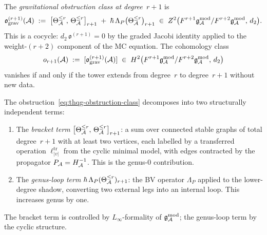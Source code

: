 \begin{definition}
\label{def:thqg-gravitational-obstruction}
The \emph{gravitational obstruction class at degree~$r{+}1$} is
\begin{equation}\label{eq:thqg-obstruction-class}
\mathfrak{o}^{(r+1)}_{\mathrm{grav}}(\mathcal{A})
\;:=\;
\bigl[\Theta_{\mathcal{A}}^{\leq r},\, \Theta_{\mathcal{A}}^{\leq r}\bigr]_{r+1}
\;+\;
\hbar\,\Lambda_P\bigl(\Theta_{\mathcal{A}}^{\leq r}\bigr)_{r+1}
\;\in\;
Z^2\bigl(F^{r+1}\mathfrak{g}_{\mathcal{A}}^{\mathrm{mod}} / F^{r+2}\mathfrak{g}_{\mathcal{A}}^{\mathrm{mod}},\, d_2\bigr).
\end{equation}
This is a cocycle: $d_2\,\mathfrak{o}^{(r+1)} = 0$ by the graded
Jacobi identity applied to the weight-$(r{+}2)$ component of the
MC equation. The cohomology class
\begin{equation}\label{eq:thqg-obstruction-cohomology}
o_{r+1}(\mathcal{A})
\;:=\;
[\mathfrak{o}^{(r+1)}_{\mathrm{grav}}(\mathcal{A})]
\;\in\;
H^2\bigl(F^{r+1}\mathfrak{g}_{\mathcal{A}}^{\mathrm{mod}} / F^{r+2}\mathfrak{g}_{\mathcal{A}}^{\mathrm{mod}},\, d_2\bigr)
\end{equation}
vanishes if and only if the tower extends from degree~$r$ to
degree~$r{+}1$ without new data.
\end{definition}

\begin{proposition}
\label{prop:thqg-two-sources}
\ClaimStatusProvedHere
{}
The obstruction~\eqref{eq:thqg-obstruction-class} decomposes into
two structurally independent terms:
\begin{enumerate}[label=\textup{(\roman*)}]
\item The \emph{bracket term}
 $\bigl[\Theta_{\mathcal{A}}^{\leq r},\,\Theta_{\mathcal{A}}^{\leq r}\bigr]_{r+1}$:
 a sum over connected stable graphs of total degree~$r{+}1$ with
 at least two vertices, each labelled by a transferred operation
 $\ell^{\mathrm{tr}}_{|v|}$ from the cyclic minimal model, with
 edges contracted by the propagator $P_{\mathcal{A}} = H_{\mathcal{A}}^{-1}$.
 This is the genus-$0$ contribution.
\item The \emph{genus-loop term}
 $\hbar\,\Lambda_P(\Theta_{\mathcal{A}}^{\leq r})_{r+1}$:
 the BV operator $\Lambda_P$ applied to the lower-degree shadow,
 converting two external legs into an internal loop. This increases
 genus by one.
\end{enumerate}
The bracket term is controlled by $L_\infty$-formality of
$\mathfrak{g}_{\mathcal{A}}^{\mathrm{mod}}$; the genus-loop term by the cyclic structure.
\end{proposition}

